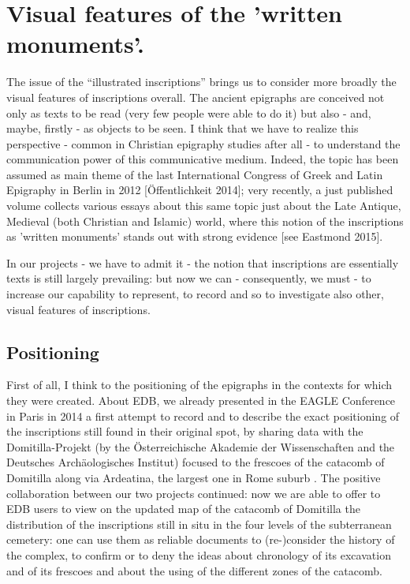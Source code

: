 \documentclass[amsthm,ebook]{saparticle}
\begin{document}
\section{Visual features of the 'written monuments'.}


\noindent The issue of the ``illustrated inscriptions'' brings us to consider more broadly the visual
features of inscriptions overall. The ancient epigraphs are conceived not only as texts to be read (very few people
were able to do it) but also - and, maybe, firstly - as objects to be seen. I think that we have to realize this
perspective - common in Christian epigraphy studies after all - to understand the communication power of this
communicative medium. Indeed, the topic has been assumed as main theme of the last International Congress of Greek and
Latin Epigraphy in Berlin in 2012 [Öffentlichkeit 2014]; very recently, a just published volume collects various essays
about this same topic just about the Late Antique, Medieval (both Christian and Islamic) world, where this notion of
the inscriptions as 'written monuments' stands out with strong evidence [see Eastmond 2015]. 

In our projects - we have to admit it - the notion that inscriptions are essentially texts is still largely
prevailing: but now we can - consequently, we must - to increase our capability to represent, to record and so to
investigate also other, visual features of inscriptions. 




\subsection{Positioning}


\noindent First of all, I think to the positioning of the epigraphs in the contexts for which they were created. About EDB, we
already presented in the EAGLE Conference in Paris in 2014 a first attempt to record and to describe the exact
positioning of the inscriptions still found in their original spot, by sharing data with the Domitilla-Projekt (by the
Österreichische Akademie der Wissenschaften and the Deutsches Archäologisches Institut) focused to the frescoes of the
catacomb of Domitilla along via Ardeatina, the largest one in Rome suburb \citet{zimmermann_epigraphy_2014}. The positive
collaboration between our two projects continued: now we are able to offer to EDB users to view on the updated map of
the catacomb of Domitilla the distribution of the inscriptions still in situ in the four levels of the subterranean
cemetery: one can use them as reliable documents to (re-)consider the history of the complex, to confirm or to deny the
ideas about chronology of its excavation and of its frescoes and about the using of the different zones of the
catacomb.
\end{document}
